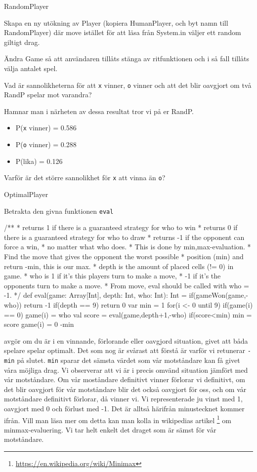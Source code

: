 \Task RandomPlayer

\Subtask Skapa en ny utökning av Player (kopiera HumanPlayer, och byt namn till RandomPlayer) där move istället för att läsa från System.in väljer ett random giltigt drag.

\Subtask Ändra Game så att användaren tillåts stänga av ritfunktionen och i så fall tillåts välja antalet spel.

\Subtask Vad är sannolikheterna för att \texttt{x} vinner, \texttt{o} vinner och att det blir oavgjort om två RandP spelar mot varandra?

Hamnar man i närheten av dessa resultat tror vi på er RandP.
\begin{itemize}
	\item P(\texttt{x} vinner) = 0.586
	\item P(\texttt{o} vinner) = 0.288
	\item P(lika) = 0.126
\end{itemize}

\Subtask Varför är det större sannolikhet för \texttt{x} att vinna än \texttt{o}?

\Task OptimalPlayer

Betrakta den givna funktionen \texttt{eval}
\begin{Code}
/**
 * returns 1 if there is a guaranteed strategy for who to win 
 * returns 0 if there is a guaranteed strategy for who to draw 
 * returns -1 if the opponent can force a win,
 * no matter what who does.
 * This is done by min,max-evaluation. 
 * Find the move that gives the opponent the worst possible
 * position (min) and return -min, this is our max.
 * depth is the amount of placed cells (!= 0) in game.
 * who is 1 if it's this players turn to make a move,
 * -1 if it's the opponents turn to make a move. 
 * From move, eval should be called with who = -1.
 */
def eval(game: Array[Int], depth: Int, who: Int): Int = {
	if(gameWon(game,-who)) return -1
	if(depth == 9) return 0
	var min = 1
	for(i <- 0 until 9) {
		if(game(i) == 0) {
			game(i) = who
			val score = eval(game,depth+1,-who)
			if(score<min){
				min = score
			}
			game(i) = 0
		}
	}
	-min
}
\end{Code}

 avgör om du är i en vinnande, förlorande eller oavgjord situation, givet att båda spelare spelar optimalt. Det som nog är svårast att förstå är varför vi retunerar \texttt{-min} på slutet. \texttt{min} sparar det sämsta värdet som vår motståndare kan få givet våra möjliga drag. Vi observerar att vi är i precis omvänd situation jämfört med vår motståndare. Om vår moståndare definitivt vinner förlorar vi definitivt, om det blir oavgjort för vår motståndare blir det också oavgjort för oss, och om vår motståndare definitivt förlorar, då vinner vi. Vi representerade ju vinst med 1, oavgjort med 0 och förlust med -1. Det är alltså härifrån minustecknet kommer ifrån. Vill man läsa mer om detta kan man kolla in wikipedias artikel \footnote{\url{https://en.wikipedia.org/wiki/Minimax}} om minmax-evaluering. Vi tar helt enkelt det draget som är sämst för vår motståndare.

